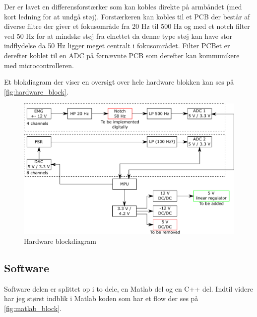 Der er lavet en differensforstærker som kan kobles direkte på armbåndet (med kort ledning for at undgå støj). Forstærkeren kan kobles til et PCB der består af diverse filtre der giver et fokusområde fra 20 Hz til 500 Hz og med et notch filter ved 50 Hz for at mindske støj fra elnettet da denne type støj kan have stor indflydelse da 50 Hz ligger meget centralt i fokusområdet. Filter PCBet er derefter koblet til en ADC på førnævnte PCB som derefter kan kommunikere med microcontrolleren. 

Et blokdiagram der viser en oversigt over hele hardware blokken kan ses på \autoref{fig:hardware_block}.

\begin{figure}[htbp]
	\centering
	\includegraphics[scale=0.6]{../../Pictures/hardware_block_diagram.pdf}
	\caption{Hardware blockdiagram}
	\label{fig:hardware_block}
\end{figure}

\subsection{Software}

Software delen er splittet op i to dele, en Matlab del og en C++ del. Indtil videre har jeg størst indblik i Matlab koden som har et flow der ses på \autoref{fig:matlab_block}. 

